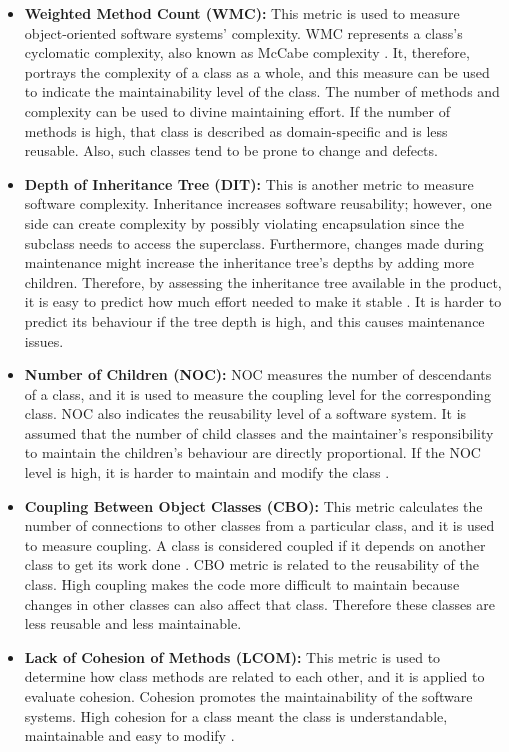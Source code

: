 \begin{itemize}
    \item \textbf{Weighted Method Count (WMC):} This metric is used to measure object-oriented software systems’ complexity. WMC represents a class's cyclomatic complexity, also known as McCabe complexity \cite{35}. It, therefore, portrays the complexity of a class as a whole, and this measure can be used to indicate the maintainability level of the class. The number of methods and complexity can be used to divine maintaining effort. If the number of methods is high, that class is described as domain-specific and is less reusable. Also, such classes tend to be prone to change and defects.
    \item \textbf{Depth of Inheritance Tree (DIT):} This is another metric to measure software complexity. Inheritance increases software reusability; however, one side can create complexity by possibly violating encapsulation since the subclass needs to access the superclass. Furthermore, changes made during maintenance might increase the inheritance tree's depths by adding more children. Therefore, by assessing the inheritance tree available in the product, it is easy to predict how much effort needed to make it stable \cite{33}. It is harder to predict its behaviour if the tree depth is high, and this causes maintenance issues.
    \item \textbf{Number of Children (NOC):} NOC measures the number of descendants of a class, and it is used to measure the coupling level for the corresponding class. NOC also indicates the reusability level of a software system. It is assumed that the number of child classes and the maintainer's responsibility to maintain the children's behaviour are directly proportional. If the NOC level is high, it is harder to maintain and modify the class \cite{36}.
    \item \textbf{Coupling Between Object Classes (CBO):} This metric calculates the number of connections to other classes from a particular class, and it is used to measure coupling. A class is considered coupled if it depends on another class to get its work done \cite{34}. CBO metric is related to the reusability of the class. High coupling makes the code more difficult to maintain because changes in other classes can also affect that class. Therefore these classes are less reusable and less maintainable.
    \item \textbf{Lack of Cohesion of Methods (LCOM):} This metric is used to determine how class methods are related to each other, and it is applied to evaluate cohesion. Cohesion promotes the maintainability of the software systems. High cohesion for a class meant the class is understandable, maintainable and easy to modify \cite{33}.
\end{itemize}

